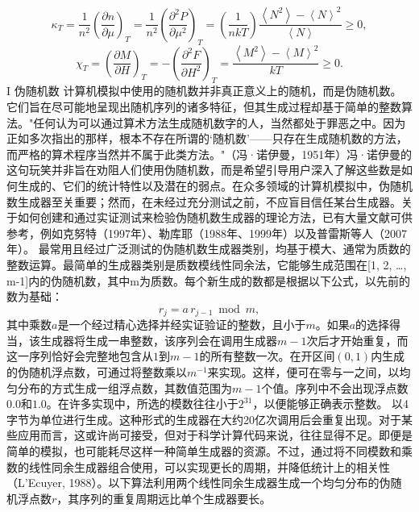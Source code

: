 \begin{equation}\tag{17.11.48}\label{eq:17.11.48}
\kappa _ { T } = \frac { 1 } { n ^{2} } \left( \frac { \partial n } { \partial \mu } \right) _ { T } = \frac { 1 } { n ^{2} } \left( \frac { \partial ^{2} P } { \partial \mu ^{2} } \right) _ { T } = \left( \frac { 1 } { n k T } \right) \frac { \left\langle N ^{2} \right\rangle - \left\langle N \right\rangle ^{2} } { \left\langle N \right\rangle } \geq 0 ,
\end{equation}
\begin{equation}\tag{17.11.49}\label{eq:17.11.49}
\chi _ { T } = \left( \frac { \partial M } { \partial H } \right) _ { T } = - \left( \frac { \partial ^{2} F } { \partial H ^{2} } \right) _ { T } = \frac { \left\langle M ^{2} \right\rangle - \left\langle M \right\rangle ^{2} } { k T } \geq 0 .
\end{equation}
I 伪随机数
计算机模拟中使用的随机数并非真正意义上的随机，而是伪随机数。它们旨在尽可能地呈现出随机序列的诸多特征，但其生成过程却基于简单的整数算法。"任何认为可以通过算术方法生成随机数字的人，当然都处于罪恶之中。因为正如多次指出的那样，根本不存在所谓的`随机数'——只存在生成随机数的方法，而严格的算术程序当然并不属于此类方法。"（冯·诺伊曼，1951年）冯·诺伊曼的这句玩笑并非旨在劝阻人们使用伪随机数，而是希望引导用户深入了解这些数是如何生成的、它们的统计特性以及潜在的弱点。在众多领域的计算机模拟中，伪随机数生成器至关重要；然而，在未经过充分测试之前，不应盲目信任某台生成器。关于如何创建和通过实证测试来检验伪随机数生成器的理论方法，已有大量文献可供参考，例如克努特（1997年）、勒库耶（1988年、1999年）以及普雷斯等人（2007年）。
最常用且经过广泛测试的伪随机数生成器类别，均基于模大、通常为质数的整数运算。最简单的生成器类别是质数模线性同余法，它能够生成范围在{[}1, 2, \ldots, m-1{]}内的伪随机数，其中m为质数。每个新生成的数都是根据以下公式，以先前的数为基础：
\begin{equation}\tag{17.11.50}\label{eq:17.11.50}
r _ { j } = a \, r _ { j - 1 } { \bmod { m } } ,
\end{equation}
其中乘数\(a\)是一个经过精心选择并经实证验证的整数，且小于\(m\)。如果\(a\)的选择得当，该生成器将生成一串整数，该序列会在调用生成器\(m-1\)次后才开始重复，而这一序列恰好会完整地包含从\(1\)到\(m-1\)的所有整数一次。在开区间\((0,1)\)内生成的伪随机浮点数，可通过将整数乘以\(m^{-1}\)来实现。这样，便可在零与一之间，以均匀分布的方式生成一组浮点数，其数值范围为\(m-1\)个值。序列中不会出现浮点数\(0.0\)和\(1.0\)。在许多实现中，所选的模数往往小于\(2^{31}\)，以便能够正确表示整数。
以4字节为单位进行生成。这种形式的生成器在大约20亿次调用后会重复出现。对于某些应用而言，这或许尚可接受，但对于科学计算代码来说，往往显得不足。即便是简单的模拟，也可能耗尽这样一种简单生成器的资源。不过，通过将不同模数和乘数的线性同余生成器组合使用，可以实现更长的周期，并降低统计上的相关性（L'Ecuyer, 1988）。以下算法利用两个线性同余生成器生成一个均匀分布的伪随机浮点数\(r\)，其序列的重复周期远比单个生成器要长。
